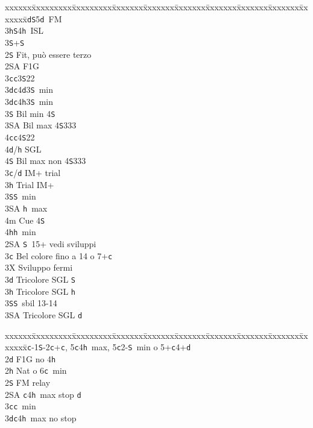 \documentclass[a4paper,italian]{article}
\newcommand{\BS}{\small{\texttt{S}}}
\newcommand{\BC}{\small{\texttt{c}}}
\newcommand{\BD}{\small{\texttt{d}}}
\newcommand{\BH}{\small{\texttt{h}}}
\newenvironment{bidtable}
{\begin{tabbing}

    xxxxxx\=xxxxxxxxx\=xxxxxxxxx\=xxxxxxx\=xxxxxxx\=xxxxxxx\=xxxxxxx\=xxxxxxx\=xxxxxxx\=xxxxxxx\=\kill}
{\end{tabbing} }%
\begin{document}
\begin{multicols}{2}
\begin{bidtable}
        3\BD {}\BS 5\BD\ FM\\
        3\BH {}\BS 4\BH\ ISL\\
        3\BS {}+\BS \-\\
        2\BS \> Fit, può essere terzo\+\\
        2\small{SA} \> F1G\+\\
        3\BC {}\BC 3\BS 22 \\
        3\BD {}\BC 4\BD 3\BS\ min\\
        3\BD {}\BC 4\BH 3\BS\ min\\
        3\BS \> Bil min 4\BS \\
        3\small{SA} \> Bil max 4\BS 333\\
        4\BC {}\BC 4\BS 22\\
        4\BD/\BH \> SGL\\
        4\BS \> Bil max non 4\BS333\-\\
        3\BC/\BD \> IM+ trial\\
        3\BH \> Trial IM+\+\\
        3\BS {}\BS\ min\\
        3\small{SA} \BH\ max\\
        4m \> Cue 4\BS \\
        4\BH {}\BH\ min\-\-\\
        2\small{SA} \BS\ 15+ vedi sviluppi\\
        3\BC \> Bel colore fino a 14 o 7+\BC\+\\
        3X \> Sviluppo fermi\-\\
        3\BD \> Tricolore SGL \BS \\
        3\BH \> Tricolore SGL \BH \\
        3\BS {}\BS\ sbil 13-14\\
        3\small{SA} \> Tricolore SGL \BD \-
    \end{bidtable}
    \bigbreak
    \begin{bidtable}
    1\BC-1\BS-2\BC\>+\BC, 5\BC4\BH\ max, 5\BC2-\BS\ min o 5+\BC4+\BD\+\\
        2\BD \> F1G no 4\BH \+\\
        2\BH \> Nat o 6\BC\ min\+\\
        2\BS \> FM relay\+\\
        2\small{SA} \BC 4\BH\ max stop \BD \\
        3\BC {}\BC\ min\\
        3\BD {}\BC 4\BH\ max no stop\\

\end{bidtable}
\end{multicols}
\end{document}
